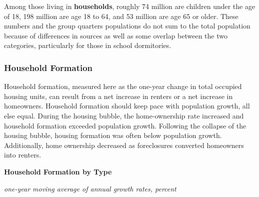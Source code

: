 \documentclass{report}
\makeatletter
\newcommand*\short[1]{\expandafter\@gobbletwo\number\numexpr#1\relax}
\newcommand{\sbar}[4]{
		\addplot[ybar stacked, bar width=2.6pt, draw opacity=0, fill=#1] 
			table [x=#2, y=#3, col sep=comma]{#4};}
\newcommand{\stdnode}[3]{\node[below, align=left, shift=({#1,#2})]{#3};}
\newcommand{\dateaxisticks}{
		date coordinates in=x, axis line style={draw=none},
		xmax={2020-10-01},
		max space between ticks=40,	    
		xtick={{1990-01-01}, {1992-01-01}, {1994-01-01}, 
			{1996-01-01}, {1998-01-01}, {2000-01-01}, 
			{2002-01-01}, {2004-01-01}, {2006-01-01},
			{2008-01-01}, {2010-01-01}, {2012-01-01}, {2014-01-01},
		    {2016-01-01}, {2018-01-01}, {2020-01-01}},
		minor xtick={{1989-01-01}, {1991-01-01}, {1993-01-01},
			{1995-01-01}, {1997-01-01}, {1999-01-01}, 
			{2001-01-01}, {2003-01-01}, {2005-01-01}, {2007-01-01},
		    {2009-01-01}, {2011-01-01}, {2013-01-01}, {2015-01-01},
		    {2017-01-01}, {2019-01-01}},
		enlarge y limits={0.06}, enlarge x limits={0.01},
		}
\newcommand{\bbar}[2]{extra #1 ticks = {{#2}}, extra #1 tick labels = ,
		extra #1 tick style = {grid=major, grid style={thick, black!25}},}
\newcommand{\stdline}[4]{\addplot[very thick, no markers, color=#1] 
		table [x=#2, y=#3, col sep=comma] {#4};	}
\newcommand{\rbars}{
		\fill[color=black!10] (axis cs:{1990-07-01},\pgfkeysvalueof{/pgfplots/ymin}) rectangle 
			(axis cs:{1991-03-01}, \pgfkeysvalueof{/pgfplots/ymax});
		\fill[color=black!10] (axis cs:{2007-12-01},\pgfkeysvalueof{/pgfplots/ymin}) rectangle 
			(axis cs:{2009-07-01}, \pgfkeysvalueof{/pgfplots/ymax});
		\fill[color=black!10] (axis cs:{2001-03-01},\pgfkeysvalueof{/pgfplots/ymin}) rectangle 
			(axis cs:{2001-11-01}, \pgfkeysvalueof{/pgfplots/ymax});
		\fill[color=black!10] (axis cs:{2020-02-01},\pgfkeysvalueof{/pgfplots/ymin}) rectangle 
			(axis cs:{2020-10-01}, \pgfkeysvalueof{/pgfplots/ymax});}
\makeatother
\begin{document}
{{{\begin{minipage}{0.76\textwidth}
Among those living in \textbf{households}, roughly 74 million are children under the age of 18, 198 million are age 18 to 64, and 53 million are age 65 or older. These numbers and the group quarters populations do not sum to the total population because of differences in sources as well as some overlap between the two categories, particularly for those in school dormitories. 
\end{minipage}
\newpage
\subsubsection*{\color{black!70} \seriffont Household Formation}
\begin{minipage}{0.76\textwidth}
\small Household formation, measured here as the one-year change in total occupied housing units, can result from a net increase in renters or a net increase in homeowners. Household formation should keep pace with population growth, all else equal. During the housing bubble, the home-ownership rate increased and household formation exceeded population growth. Following the collapse of the housing bubble, housing formation was often below population growth. Additionally, home ownership decreased as foreclosures converted homeowners into renters. \\



\vspace{4mm}

\normalsize \textbf{Household Formation by Type}

\footnotesize{\textit{one-year moving average of annual growth rates, percent}}

\hspace*{-2mm} 


\end{minipage}}}}
\end{document}
